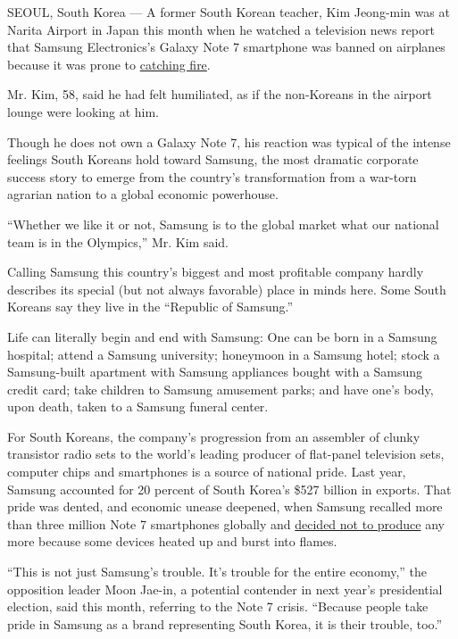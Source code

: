 SEOUL, South Korea --- A former South Korean teacher, Kim Jeong-min was
at Narita Airport in Japan this month when he watched a television news
report that Samsung Electronics's Galaxy Note 7 smartphone was banned on
airplanes because it was prone to
\href{http://www.nytimes3xbfgragh.onion/2016/09/03/business/samsung-galaxy-note-battery.html?_r=0}{catching
fire}.

Mr. Kim, 58, said he had felt humiliated, as if the non-Koreans in the
airport lounge were looking at him.

Though he does not own a Galaxy Note 7, his reaction was typical of the
intense feelings South Koreans hold toward Samsung, the most dramatic
corporate success story to emerge from the country's transformation from
a war-torn agrarian nation to a global economic powerhouse.

``Whether we like it or not, Samsung is to the global market what our
national team is in the Olympics,'' Mr. Kim said.

Calling Samsung this country's biggest and most profitable company
hardly describes its special (but not always favorable) place in minds
here. Some South Koreans say they live in the ``Republic of Samsung.''

Life can literally begin and end with Samsung: One can be born in a
Samsung hospital; attend a Samsung university; honeymoon in a Samsung
hotel; stock a Samsung-built apartment with Samsung appliances bought
with a Samsung credit card; take children to Samsung amusement parks;
and have one's body, upon death, taken to a Samsung funeral center.

For South Koreans, the company's progression from an assembler of clunky
transistor radio sets to the world's leading producer of flat-panel
television sets, computer chips and smartphones is a source of national
pride. Last year, Samsung accounted for 20 percent of South Korea's
\$527 billion in exports. That pride was dented, and economic unease
deepened, when Samsung recalled more than three million Note 7
smartphones globally and
\href{http://www.nytimes3xbfgragh.onion/2016/10/12/business/international/samsung-galaxy-note7-terminated.html}{decided
not to produce} any more because some devices heated up and burst into
flames.

``This is not just Samsung's trouble. It's trouble for the entire
economy,'' the opposition leader Moon Jae-in, a potential contender in
next year's presidential election, said this month, referring to the
Note 7 crisis. ``Because people take pride in Samsung as a brand
representing South Korea, it is their trouble, too.''

